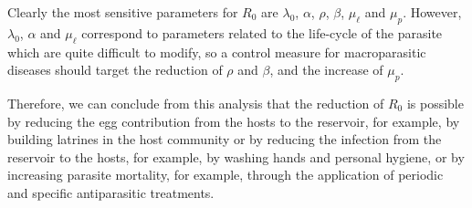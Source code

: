 \documentclass[eng]{MMSB-class-eng}
\begin{document}
{	Clearly the most sensitive parameters for $R_0$ are $\lambda_0$, $\alpha$, $\rho$, $\beta$, $\mu_{\ell}$ and $\mu_p$.
	However, $\lambda_0$, $\alpha$ and $\mu_{\ell}$ correspond to parameters related to the life-cycle of the parasite which are quite difficult to modify, so a control measure for macroparasitic diseases should target  the reduction of $\rho$ and $\beta$, and the increase of $\mu_p$.
	
	Therefore, we can conclude from this analysis that the reduction of $R_0$ 
	is possible by reducing the egg contribution from the hosts to the reservoir, for example, by building latrines in the host community 
	or by reducing the infection from the reservoir to the hosts, for example, by washing hands and personal hygiene,  
	or by increasing parasite mortality, for example, through the application of periodic and specific antiparasitic treatments.	
	
	
}
\end{document}
